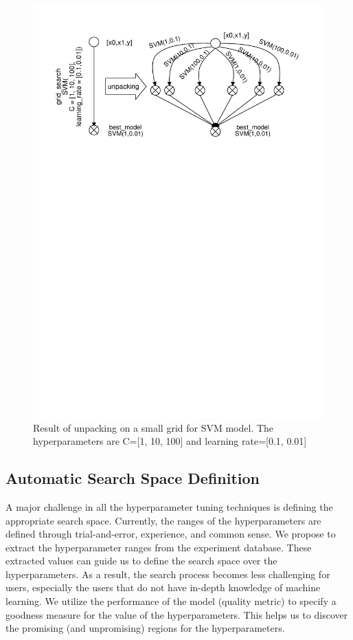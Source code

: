 \begin{figure}
\centering
\includegraphics[width=\columnwidth]{../images/grid-unpacking}
\caption{Result of unpacking on a small grid for SVM model. The hyperparameters are C=[1, 10, 100] and learning rate=[0.1, 0.01]}
\label{fig-grid-unpacking}
\end{figure}

\subsection{Automatic Search Space Definition}\label{sub-section-automatic-search-definition}
A major challenge in all the hyperparameter tuning techniques is defining the appropriate search space.
Currently, the ranges of the hyperparameters are defined through trial-and-error, experience, and common sense.
We propose to extract the hyperparameter ranges from the experiment database.
These extracted values can guide us to define the search space over the hyperparameters.
As a result, the search process becomes less challenging for users, especially the users that do not have in-depth knowledge of machine learning.
We utilize the performance of the model (quality metric) to specify a goodness measure for the value of the hyperparameters.
This helps us to discover the promising (and unpromising) regions for the hyperparameters.

